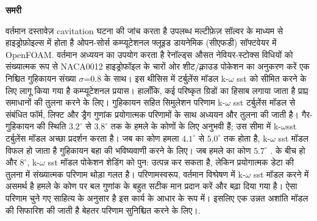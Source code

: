 \newpage
\begin{changemargin}{1cm}{1cm}

\begin{Abstract}
\thispagestyle{plain}
\vspace{1cm}

\begin{sanskrit}

\textbf{समरी}

वर्तमान दस्तावेज़ cavitation घटना की जांच करता है उपलब्ध मल्टीफ़ेज़ सॉल्वर के माध्यम से 
हाइड्रोफ़ोइल्स में होता है ओपन-सोर्स कम्प्यूटेशनल फ्लूइड डायनेमिक (सीएफडी) सॉफ्टवेयर में OpenFOAM\textsuperscript{\textregistered}. 
वर्तमान अध्ययन का उपयोग करता है रेनॉल्ड्स औसत नेवियर-स्टोक्स विधियों को संख्यात्मक रूप से NACA0012 हाइड्रोफॉइल के चारों ओर शीट/क्लाउड 
पोकेशन का अनुकरण करें एक निश्चित गुहिकायन संख्या $\sigma$=0.8 के साथ। इस थीसिस में टर्बुलेंस मॉडल k-$\omega$ sst को सीमित करने के 
लिए लागू किया गया है कम्प्यूटेशनल प्रयास। हालाँकि, कई परिष्कृत ग्रिडों का हिसाब लगाया जाता है प्राप्त समाधानों की तुलना करने के लिए। गुहिकायन सहित
 सिमुलेशन परिणाम k-$\omega$ sst टर्बुलेंस मॉडल से संबंधित फॉर्म, लिफ्ट और ड्रैग गुणांक प्रयोगात्मक परिणामों के साथ अध्ययन और तुलना की जाती है। 
 गैर-गुहिकायन की स्थिति $3.2^{\circ}$ से $3.8^{\circ}$ तक के हमले के कोणों के लिए अनुभवी हैं; उस सीमा में k-$\omega$sst टर्बुलेंस मॉडल 
 अच्छा प्रदर्शन करता है। जब का कोण हमला $4.1^{\circ}$ से $5.0^{\circ}$ तक होता है, k-$\omega$ sst मॉडल विफल हो जाता है गुहिकायन 
 बहा की भविष्यवाणी करने के लिए। जब हमले का कोण $5.7^{\circ}$ . के बीच हो और $8^{\circ}$, k-$\omega$ sst मॉडल पोकेशन शेडिंग को पुन: 
 उत्पन्न कर सकता है, लेकिन प्रयोगात्मक डेटा की तुलना में संख्यात्मक परिणाम थोड़ा गलत है। परिणामस्वरूप, वर्तमान विश्लेषण में k-$\omega$ sst मॉडल करने में 
 असमर्थ है हमले के कोण पर बल गुणांक के बहुत सटीक मान प्रदान करें और बढ़ा दिया गया है। ऐसा परिणाम चुने गए साहित्य के अनुसार है इस कार्य के आधार के रूप 
 में। इसलिए एक उन्नत अशांति मॉडल की सिफारिश की जाती है बेहतर परिणाम सुनिश्चित करने के लिए।.


\end{sanskrit}


\end{Abstract}
\end{changemargin}
